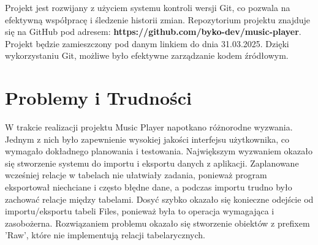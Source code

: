 {Projekt jest rozwijany z użyciem systemu kontroli wersji Git, co pozwala na efektywną współpracę i śledzenie historii zmian. Repozytorium projektu znajduje się na GitHub pod adresem: \newline
\textbf{https://github.com/byko-dev/music-player}. Projekt będzie zamieszczony pod danym linkiem do dnia 31.03.2025. Dzięki wykorzystaniu Git, możliwe było efektywne zarządzanie kodem źródłowym.}

\section{Problemy i Trudności}
{W trakcie realizacji projektu Music Player napotkano różnorodne wyzwania. Jednym z nich było zapewnienie wysokiej jakości interfejsu użytkownika, co wymagało dokładnego planowania i testowania. Największym wyzwaniem okazało się stworzenie systemu do importu i eksportu danych z aplikacji. Zaplanowane wcześniej relacje w tabelach nie ułatwiały zadania, ponieważ program eksportował niechciane i często błędne dane, a podczas importu trudno było zachować relacje między tabelami. Dosyć szybko okazało się konieczne odejście od importu/eksportu tabeli Files, ponieważ była to operacja wymagająca i zasobożerna. Rozwiązaniem problemu okazało się stworzenie obiektów z prefixem 'Raw', które nie implementują relacji tabelarycznych.
}